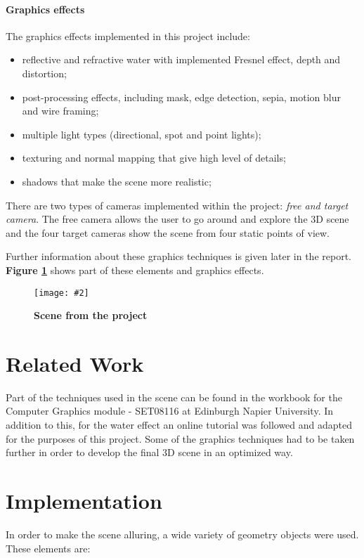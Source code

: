 \documentclass[10pt, a4paper]{article}
\newcommand{\figuremacro}[5]{
    \begin{figure}[#1]
        \centering
        \texttt{[image: \#2]}
        \caption[#3]{\textbf{#3}#4}
        \label{fig:#2}
    \end{figure}
}
\begin{document}
	\paragraph{Graphics effects}The graphics effects implemented in this project include:
	\begin{itemize}
		\item reflective and refractive water with implemented Fresnel effect, depth and distortion;
		\item post-processing effects, including mask, edge detection, sepia, motion blur and wire framing;
		\item multiple light types (directional, spot and point lights);
		\item texturing and normal mapping that give high level of details;
		\item shadows that make the scene more realistic;
	\end{itemize}
    There are two types of cameras implemented within the project: \textit{free and target camera}. The free camera allows the user to go around and explore the 3D scene and the four target cameras show the scene from four static points of view.
    
    Further information about these graphics techniques is given later in the report. \textbf{Figure {\ref{fig:general}}} shows part of these elements and graphics effects.
	\figuremacro{h}{general}{Scene from the project}{ }{1.0}
	
	\section{Related Work}
	Part of the techniques used in the scene can be found in the workbook for the Computer Graphics module - SET08116 at Edinburgh Napier University\cite{book}. In addition to this, for the water effect an online tutorial\cite{onlineTutorial} was followed and adapted for the purposes of this project. Some of the graphics techniques had to be taken further in order to develop the final 3D scene in an optimized way.

	\section{Implementation}
	In order to make the scene alluring, a wide variety of geometry objects were used. These elements are:
\end{document}
